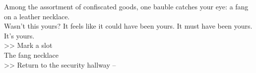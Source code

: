 Among the assortment of confiscated goods, one bauble catches your eye: a fang on a leather necklace.\\

Wasn’t this yours? It feels like it could have been yours. It must have been yours. It’s yours.\\
>> Mark a  slot\\
 The fang necklace\\

>> Return to the security hallway -- 